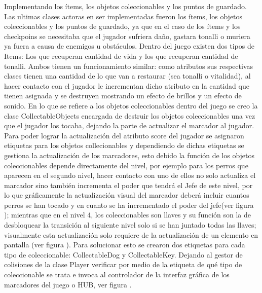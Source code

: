  Implementando los ítems, los objetos coleccionables y los puntos de guardado.
Las ultimas clases actoras en ser implementadas fueron los ítems, los objetos coleccionables y los puntos de guardado, ya que en el caso de los ítems y los checkpoins se necesitaba que el jugador sufriera daño, gastara tonalli o muriera ya fuera a causa de enemigos u obstáculos. 
Dentro del juego existen dos tipos de Items: Los que recuperan cantidad de vida y los que recuperan cantidad de tonalli. Ambos tienen un funcionamiento similar: como atributos sus respectivas clases tienen una cantidad de lo que van a restaurar (sea tonalli o vitalidad), al hacer contacto con el jugador le incrementan dicho atributo en la cantidad que tienen asignada y se destruyen mostrando un efecto de brillos y un efecto de sonido. 
En lo que se refiere a los objetos coleccionables dentro del juego se creo la clase CollectableObjects encargada de destruir los objetos coleccionables una vez que el jugador los tocaba, dejando la parte de actualizar el marcador al jugador. Para poder lograr la actualización del atributo score del jugador se asignaron etiquetas para los objetos collecionables y dependiendo de dichas etiquetas se gestiona la actualización de los marcadores, esto debido la función de los objetos coleccionables depende directamente del nivel, por ejemplo para los perros que aparecen en el segundo nivel, hacer contacto con uno de ellos no solo actualiza el marcador sino también incrementa el poder que tendrá el Jefe de este nivel, por lo que gráficamente la actualización visual del marcador deberá incluir cuantos perros se han tocado y en cuanto se ha incrementado el poder del jefe(ver figura ); mientras que en el nivel 4, los coleccionables son llaves y su función son la de desbloquear la transición al siguiente nivel solo si se han juntado todas las llaves; visualmente esta actualización solo requiere de la actualización de un elemento en pantalla (ver figura ). Para solucionar esto se crearon dos etiquetas para cada tipo de coleccionable: CollectableDog y CollectableKey.  Dejando al gestor de colisiones de la clase Player verificar por medio de la etiqueta de qué tipo de coleccionable se trata e invoca al controlador de la interfaz gráfica de los marcadores del juego o HUB, ver figura .